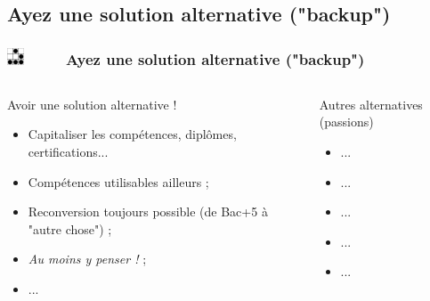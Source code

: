 \documentclass[slidetop,11pt]{beamer}
\def\sectionPartVd{Ayez une solution alternative ("backup")}
\def\moreInFrameTitle{\includegraphics[height=0.5cm]{img/logo_glider.png}~~~~~}
\begin{document}
\subsection{\sectionPartVd}
\begin{frame}
	\frametitle{\moreInFrameTitle \sectionPartVd}
	\begin{columns}[T]
	\begin{column}[T]{5.50cm}
		\begin{beamerboxesrounded}	[lower=substructureTR, %
		 				 upper=block title TR,%
						 shadow=true]%
		       {Avoir une solution alternative !}
			\begin{itemize}
				\item Capitaliser les comp{\'e}tences, dipl{\^o}mes, certifications...
				\item Comp{\'e}tences utilisables ailleurs ; 
				\item Reconversion toujours possible (de Bac+5 {\`a} "autre chose") ; 
				\item \emph{Au moins y penser !} ; 
				\item ... 
			\end{itemize}
		\end{beamerboxesrounded}
	\end{column}
	\begin{column}[T]{5.50cm}
		\begin{beamerboxesrounded}	[lower=substructureUN, %
		 				 upper=block title UN,%
						 shadow=true]%
		       {Autres alternatives (passions)}
			\begin{itemize}
				\item ...
				\item ...
				\item ... 
				\item ... 
				\item ... 
			\end{itemize}
		\end{beamerboxesrounded}
	\end{column}
	\end{columns}
\end{frame}
\end{document}
